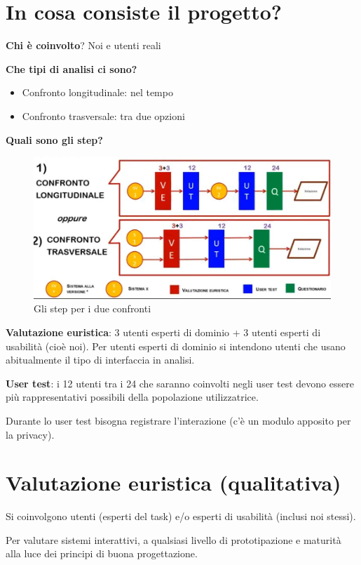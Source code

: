 \documentclass[11pt,a4paper]{book}
\begin{document}
\section{In cosa consiste il progetto?}
\textbf{Chi è coinvolto}? Noi e utenti reali

\textbf{Che tipi di analisi ci sono?}
\begin{itemize}
	\item Confronto longitudinale: nel tempo
	\item Confronto trasversale: tra due opzioni
\end{itemize}
\textbf{Quali sono gli step?}
\begin{figure}[h!]
	\begin{center}
		\includegraphics[scale=0.55]{img/010.jpg}
		\caption{Gli step per i due confronti}
		\label{fig: 010}
	\end{center}
\end{figure}
\textbf{Valutazione euristica}: 3 utenti esperti di dominio + 3 utenti esperti di usabilità (cioè noi). Per utenti esperti di dominio si intendono utenti che usano abitualmente il tipo di interfaccia in analisi.

\textbf{User test}: i 12 utenti tra i 24 che saranno coinvolti negli user test devono essere più rappresentativi possibili della popolazione utilizzatrice.

Durante lo user test bisogna registrare l'interazione (c'è un modulo apposito per la privacy).

\section{Valutazione euristica (qualitativa)} \label{par: euristica}
Si coinvolgono utenti (esperti del task) e/o esperti di usabilità (inclusi noi stessi).

Per valutare sistemi interattivi, a qualsiasi livello di prototipazione e maturità alla luce dei principi di buona progettazione.
\end{document}
